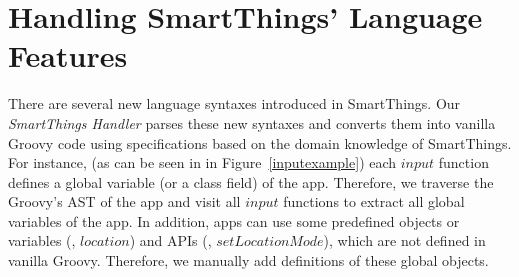 \section{Handling SmartThings' Language Features}
There are several new language syntaxes introduced in SmartThings.
Our \textit{SmartThings Handler} parses these new syntaxes and converts them into
vanilla Groovy code using specifications based on the domain knowledge of SmartThings.
For instance, (as can be seen in {\color{black}in Figure~\ref{inputexample}) each $input$ function} defines a global variable (or a class field) of the app.
Therefore, we traverse the Groovy's AST of the app and visit all $input$ functions to extract all global variables of the app.
In addition, apps can use some predefined objects or variables (\eg, $location$) and APIs (\eg, $setLocationMode$),
which are not defined in vanilla Groovy. Therefore, we manually add definitions of these global objects.



